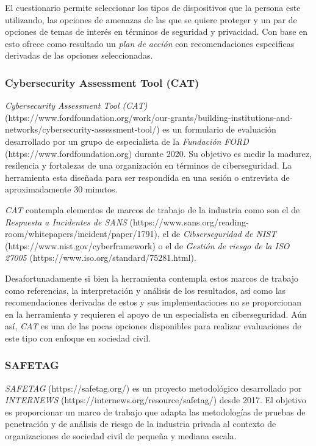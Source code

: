 \documentclass[12pt]{caltech_thesis}
\begin{document}
El cuestionario permite seleccionar los tipos de dispositivos que la persona este utilizando, las opciones de amenazas de las que se quiere proteger y un par de opciones de temas de interés en términos de seguridad y privacidad. Con base en esto ofrece como resultado un \textit{plan de acción} con recomendaciones especificas derivadas de las opciones seleccionadas.

\subsubsection{Cybersecurity Assessment Tool (CAT)}

\textit{Cybersecurity Assessment Tool (CAT)} (https://www.fordfoundation.org/work/our-grants/building-institutions-and-networks/cybersecurity-assessment-tool/) es un formulario de evaluación desarrollado por un grupo de especialista de la \textit{Fundación FORD} (https://www.fordfoundation.org) durante 2020. Su objetivo es medir la madurez, resilencia y fortalezas de una organización en términos de ciberseguridad. La herramienta esta diseñada para ser respondida en una sesión o entrevista de aproximadamente 30 minutos.

\textit{CAT} contempla elementos de marcos de trabajo de la industria como son el de \textit{Respuesta a Incidentes de SANS} (https://www.sans.org/reading-room/whitepapers/incident/paper/1791), el de \textit{Cibserseguridad de NIST} (https://www.nist.gov/cyberframework) o el de \textit{Gestión de riesgo de la ISO 27005} (https://www.iso.org/standard/75281.html).

Desafortunadamente si bien la herramienta contempla estos marcos de trabajo como referencias, la interpretación y análisis de los resultados, así como las recomendaciones derivadas de estos y sus implementaciones no se proporcionan en la herramienta y requieren el apoyo de un especialista en ciberseguridad. Aún así, \textit{CAT} es una de las pocas opciones disponibles para realizar evaluaciones de este tipo con enfoque en sociedad civil.

\subsubsection{SAFETAG}

\textit{SAFETAG} (https://safetag.org/) es un proyecto metodológico desarrollado por \textit{INTERNEWS} (https://internews.org/resource/safetag/) desde 2017. El objetivo es proporcionar un marco de trabajo que adapta las metodologías de pruebas de penetración y de análisis de riesgo de la industria privada al contexto de organizaciones de sociedad civil de pequeña y mediana escala. 
\end{document}
